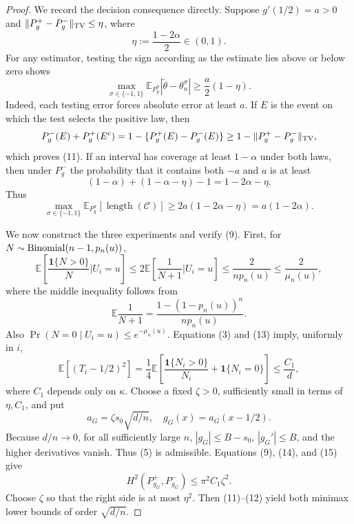 \documentclass{article}
\begin{document}
\begin{proof}
We record the decision consequence directly.  Suppose \(g'(1/2)=a>0\) and \(\|P_g^+-P_g^-\|_{\rm TV}\leq\eta\), where
\[
 \eta:=\frac{1-2\alpha}{2}\in(0,1).
\tag{10}
\]
For any estimator, testing the sign according as the estimate lies above or below zero shows
\[
 \max_{\sigma\in\{-1,1\}}
 \mathbb E_{P_g^\sigma}|\widetilde\theta-\theta_n^\sigma|
 \geq\frac a2(1-\eta).
\tag{11}
\]
Indeed, each testing error forces absolute error at least \(a\).  If \(E\) is the event on which the test selects the positive law, then
\[
 P_g^-(E)+P_g^+(E^c)
 =1-\{P_g^+(E)-P_g^-(E)\}
 \geq1-\|P_g^+-P_g^-\|_{\rm TV},
\]
which proves (11).  If an interval has coverage at least \(1-\alpha\) under both laws, then under \(P_g^-\) the probability that it contains both \(-a\) and \(a\) is at least
\[
 (1-\alpha)+(1-\alpha-\eta)-1=1-2\alpha-\eta.
\]
Thus
\[
 \max_{\sigma\in\{-1,1\}}
 \mathbb E_{P_g^\sigma}[\operatorname{length}(\mathcal C)]
 \geq2a(1-2\alpha-\eta)=a(1-2\alpha).
\tag{12}
\]

We now construct the three experiments and verify (9).  First, for \(N\sim{\rm Binomial}(n-1,p_n(u))\),
\[
 \mathbb E\!\left[\frac{\mathbf1\{N>0\}}N\mathrel{\Big|}U_i=u\right]
 \leq2\mathbb E\!\left[\frac1{N+1}\mathrel{\Big|}U_i=u\right]
 \leq\frac2{np_n(u)}\leq\frac2{\mu_n(u)},
\tag{13}
\]
where the middle inequality follows from
\[
 \mathbb E\frac1{N+1}
 =\frac{1-(1-p_n(u))^n}{np_n(u)}.
\]
Also \(\Pr(N=0\mid U_i=u)\leq e^{-\mu_n(u)}\).  Equations (3) and (13) imply, uniformly in \(i\),
\[
 \mathbb E\left[(T_i-1/2)^2\right]
 =\frac14\mathbb E\!\left[\frac{\mathbf1\{N_i>0\}}{N_i}
 +\mathbf1\{N_i=0\}\right]
 \leq\frac{C_1}{d},
\tag{14}
\]
where \(C_1\) depends only on \(\kappa\).  Choose a fixed \(\zeta>0\), sufficiently small in terms of \(\eta,C_1\), and put
\[
 a_G=\zeta s_0\sqrt{d/n},\quad g_G(x)=a_G(x-1/2).
\tag{15}
\]
Because \(d/n\to0\), for all sufficiently large \(n\), \(|g_G|\leq B-s_0\), \(|g_G'|\leq B\), and the higher derivatives vanish.  Thus (5) is admissible.  Equations (9), (14), and (15) give
\[
 H^2(P_{g_G}^+,P_{g_G}^-)\leq\pi^2C_1\zeta^2.
\tag{16}
\]
Choose \(\zeta\) so that the right side is at most \(\eta^2\).  Then (11)--(12) yield both minimax lower bounds of order \(\sqrt{d/n}\).


\end{proof}
\end{document}
